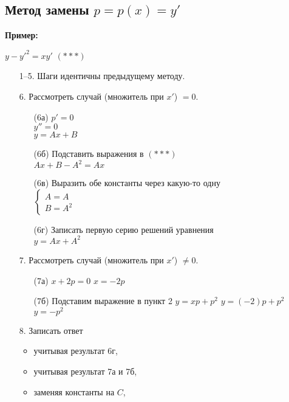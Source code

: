 \documentclass[10pt, a4paper]{article}
\begin{document}
\subsection{Метод замены $p = p(x) = y'$}
\textbf{Пример:}
\par $y - y'^2 = xy'$ $(***)$
\begin{enumerate}
    \item[1--5.] Шаги идентичны предыдущему методу.
    \item[6.] Рассмотреть случай (множитель при $x'$) $= 0$.
        \begin{itemize}
            \item[(6а)] $p' = 0$ \\
                        $y'' = 0$ \\
                        $y = Ax + B$
            \item[(6б)] Подставить выражения в $(***)$ \\
                        $Ax + B - A^2 = Ax$
            \item[(6в)] Выразить обе константы через какую-то одну \\
                        $\begin{cases}
                            A = A \\
                            B = A^2
                        \end{cases}$
            \item[(6г)] Записать первую серию решений уравнения \\
                        $y = Ax + A^2$
        \end{itemize}
    \item[7.] Рассмотреть случай (множитель при $x'$) $\neq 0$.
        \begin{itemize}
            \item[(7а)] $x + 2p = 0$
                        $x = -2p$
            \item[(7б)] Подставим выражение в пункт 2
                        $y = xp + p^2$
                        $y = (-2)p + p^2$
                        $y = -p^2$
        \end{itemize}
    \item[8.]   Записать ответ
        \begin{itemize}
            \item учитывая результат 6г,
            \item учитывая результат 7а и 7б,
            \item заменяя константы на $C$,

\end{itemize}
\end{enumerate}
\end{document}
